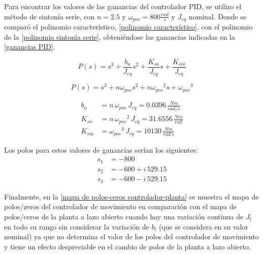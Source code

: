 \documentclass[a4paper, 10pt, onecolumn,journal]{ieeeconf}
\begin{document}
Para encontrar los valores de las ganancias del controlador PID, se utilizo el método de sintonía serie, con $n=2.5$ y $\omega_{pos}=800\frac{rad}{s}$ y $J_{eq}$ nominal. Donde se comparó el polinomio característico, \cref{polinomio característico}, con el polinomio de la \cref{polinomio sintonía serie}, 
obteniéndose las ganancias indicadas en la \cref{ganancias PID}.

\begin{equation}
	P(s) =  s^3 + \frac{b_a}{J_{eq}} s^2 + \frac{K_{sa}}{J_{eq}} s + \frac{K_{sia}}{J_{eq}}
	\label{polinomio característico}
\end{equation}

\begin{equation}
	P(s) =  s^3 + n \omega_{pos} s^2 + n {\omega_{pos}}^2 s + {\omega_{pos}}^3 
	\label{polinomio sintonía serie}
\end{equation}

\begin{align}
	b_a &=  n \, \omega_{pos} \, J_{eq}= 0.0396 \, \frac{Nm}{rad/s} \\
	K_{sa} &=  n \, {\omega_{pos}}^2 \, J_{eq}= 31.6556 \, \frac{Nm}{rad}\\
	K_{sia} &= {\omega_{pos}}^3 \, J_{eq}= 10130 \, \frac{Nm}{rad \, s}
	\label{ganancias PID}
\end{align}

Los polos para estos valores de ganancias serían los siguientes:
\begin{align}
	s_1 &= -800 \\
	s_2 &=  -600 + i \, 529.15\\
	s_3 &=  -600 - i \, 529.15
\end{align}

Finalmente, en la \cref{mapa de polos-ceros controlador-planta} se muestra el mapa de polos/zeros del controlador de movimiento
en comparación con el mapa de polos/ceros de la planta a lazo abierto cuando hay una variación continua de $J_l$ en todo su rango
sin considerar la variación de $b_l$ (que se considera en su valor nominal) ya que no determina el valor de los polos del controlador de movimiento y tiene un 
efecto despreciable en el cambio de polos de la planta a lazo abierto.
\end{document}
